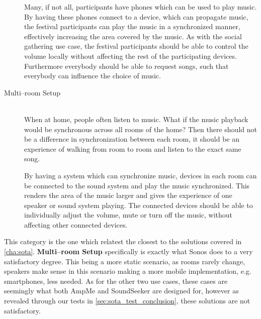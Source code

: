 \begin{description}
        Many, if not all, participants have phones which can be used to play music.
        By having these phones connect to a device, which can propagate music,
        the festival participants can play the music in a synchronized manner,
        effectively increasing the area covered by the music.
        As with the social gathering use case,
        the festival participants should be able to control the volume locally without affecting the rest of the participating devices.
        Furthermore everybody should be able to request songs, such that everybody can influence the choice of music.

    \item[Multi--room Setup] \hfill\\
        When at home, people often listen to music.
        What if the music playback would be synchronous across all rooms of the home?
        Then there should not be a difference in synchronization between each room,
        it should be an experience of walking from room to room and listen to the exact same song.

        By having a system which can synchronize music, devices in each room can be connected to the sound system and play the music synchronized.
        This renders the area of the music larger and gives the experience of one speaker or sound system playing.
        The connected devices should be able to individually adjust the volume, mute or turn off the music,
        without affecting other connected devices. 
\end{description}

This category is the one which relatest the closest to the solutions covered in \cref{cha:sota}.
\textbf{Multi--room Setup} specifically is exactly what Sonos does to a very satisfactory degree.
This being a more static scenario, as rooms rarely change, speakers make sense in this scenario making a more mobile implementation, e.g. smartphones, less needed.
As for the other two use cases, these cases are seemingly what both AmpMe and SoundSeeker are designed for, however as revealed through our tests in \cref{sec:sota_test_conclusion}, these solutions are not satisfactory.
